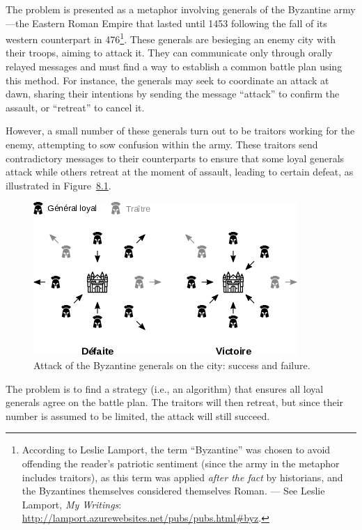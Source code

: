 \documentclass[
  a5paper,
  smalldemyvopaper,10pt,twoside,onecolumn,openright,extrafontsizes,hidelinks]{memoir}
\begin{document}
The problem is presented as a metaphor involving generals of the
Byzantine army---the Eastern Roman Empire that lasted until 1453
following the fall of its western counterpart in 476\footnote{According
  to Leslie Lamport, the term ``Byzantine'' was chosen to avoid
  offending the reader's patriotic sentiment (since the army in the
  metaphor includes traitors), as this term was applied \emph{after the
  fact} by historians, and the Byzantines themselves considered
  themselves Roman. --- See Leslie Lamport, \emph{My Writings}:
  \url{http://lamport.azurewebsites.net/pubs/pubs.html\#byz}.}. These
generals are besieging an enemy city with their troops, aiming to attack
it. They can communicate only through orally relayed messages and must
find a way to establish a common battle plan using this method. For
instance, the generals may seek to coordinate an attack at dawn, sharing
their intentions by sending the message ``attack'' to confirm the
assault, or ``retreat'' to cancel it.

However, a small number of these generals turn out to be traitors
working for the enemy, attempting to sow confusion within the army.
These traitors send contradictory messages to their counterparts to
ensure that some loyal generals attack while others retreat at the
moment of assault, leading to certain defeat, as illustrated in
Figure~\hyperref[fig:byzantine-generals-attack]{8.1}.

\begin{figure}

{\centering \includegraphics{chapters/img/byzantine-generals-attack.png}

}

\caption{Attack of the Byzantine generals on the city: success and
failure.}

\end{figure}%

The problem is to find a strategy (i.e., an algorithm) that ensures all
loyal generals agree on the battle plan. The traitors will then retreat,
but since their number is assumed to be limited, the attack will still
succeed.
\end{document}
